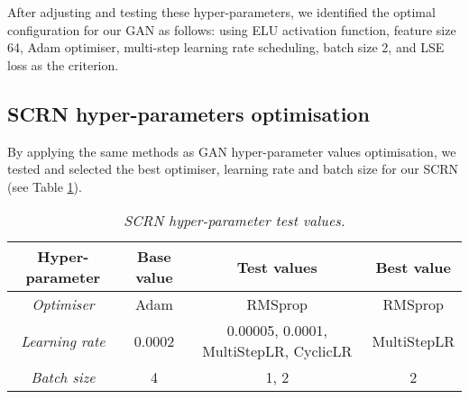 \noindent After adjusting and testing these hyper-parameters, we identified the optimal configuration for our GAN as follows: using ELU activation function, feature size 64, Adam optimiser, multi-step learning rate scheduling, batch size 2, and LSE loss as the criterion.


%
%
%



\subsection{SCRN hyper-parameters optimisation}
By applying the same methods as GAN hyper-parameter values optimisation, we tested and selected the best optimiser, learning rate and batch size for our SCRN (see Table \ref{tab:scrn_param}).

\begin{table}[ht]
	\centering
	\begin{tabular}{cccc}
		\hline
		\textbf{Hyper-parameter} & \textbf{Base value} & \textbf{Test values} & \textbf{Best value} \\
		\hline
		\textit{Optimiser} & Adam & RMSprop & RMSprop \\
		\textit{Learning rate} & 0.0002 & 0.00005, 0.0001, MultiStepLR, CyclicLR & MultiStepLR\\
		\textit{Batch size} & 4 & 1, 2 & 2  \\
		\hline
	\end{tabular}
	\caption{\textit{SCRN hyper-parameter test values.}}
	\label{tab:scrn_param}
\end{table}

